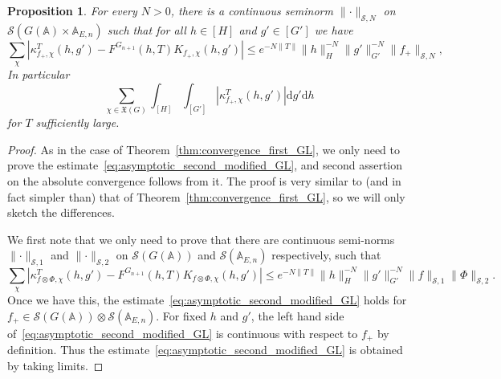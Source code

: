 \documentclass[letterpaper,11pt]{amsart}
\newcommand{\fX}{\mathfrak{X}}
\newcommand{\bA}{\mathbb{A}}
\newcommand{\cS}{\mathcal{S}}
\newcommand{\rd}{\mathrm{d}}
\newcommand{\<}{\negthickspace}
\providecommand{\aabs}[1]{\lVert#1\rVert}
\providecommand{\Abs}[1]{\left\lvert#1\right\rvert}
\theoremstyle{definition}
\theoremstyle{plain}
\newtheorem{prop}[definition]{Proposition}
\theoremstyle{remark}
\numberwithin{equation}{section}
\begin{document}
\begin{prop}    \label{prop:asymptotic_second_GL}
For every $N>0$, there is a continuous seminorm $\aabs{\cdot}_{\cS, N}$ on
$\cS(G(\bA) \times \bA_{E,n})$ such that for all $h \in [H]$ and $g' \in
[G']$ we have
    \begin{equation}    \label{eq:asymptotic_second_modified_GL}
    \sum_{\chi} \Abs{ \kappa_{f_+, \chi}^T(h, g') -
    F^{G_{n+1}}(h, T) K_{f_+, \chi}(h, g')} \le e^{-N\aabs{T}}
    \aabs{h}_{H}^{-N}
    \aabs{g'}_{G'}^{-N} \aabs{f_+}_{\cS, N},
    \end{equation}
In particular
    \[
    \sum_{\chi \in \fX(G)} \int_{[H]} \int_{[G']}
    \left|\kappa_{f_+, \chi}^T(h, g')\right|
    \rd g' \rd h
    \]
for $T$ sufficiently large.
\end{prop}

\begin{proof}
As in the case of Theorem~\ref{thm:convergence_first_GL}, we only need to
prove the estimate~\eqref{eq:asymptotic_second_modified_GL}, and second
assertion on the absolute convergence follows from it. The proof is very
similar to (and in fact simpler than) that of
Theorem~\ref{thm:convergence_first_GL}, so we will only sketch the
differences.

We first note that we only need to prove that there are continuous semi-norms
$\aabs{\cdot}_{\cS, 1}$ and $\aabs{\cdot}_{\cS, 2}$ on $\cS(G(\bA))$ and
$\cS(\bA_{E, n})$ respectively, such that
    \[
    \sum_{\chi} \Abs{ \kappa_{f \otimes \Phi, \chi}^T(h, g') -
    F^{G_{n+1}}(h, T) K_{f \otimes \Phi, \chi}(h, g')} \le e^{-N\aabs{T}}
    \aabs{h}_{H}^{-N}
    \aabs{g'}_{G'}^{-N} \aabs{f}_{\cS, 1} \aabs{\Phi}_{\cS, 2}.
    \]
Once we have this, the estimate~\eqref{eq:asymptotic_second_modified_GL} holds
for $f_+ \in \cS(G(\bA)) \otimes \cS(\bA_{E, n})$.
For fixed $h$ and $g'$, the left hand side
of~\eqref{eq:asymptotic_second_modified_GL} is continuous with respect to
$f_+$ by definition. Thus the
estimate~\eqref{eq:asymptotic_second_modified_GL} is obtained by taking
limits.


\end{proof}
\end{document}
